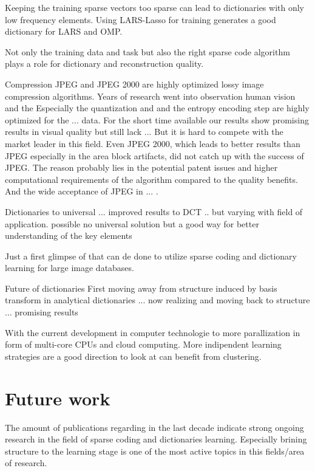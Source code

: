 Keeping the training sparse vectors too sparse can lead to dictionaries with
only low frequency elements. Using LARS-Lasso for training generates a good
dictionary for LARS and OMP. 




Not only the training data and task but also the right
sparse code algorithm plays a role for dictionary and reconstruction quality.


Compression 
JPEG and JPEG 2000 are highly optimized lossy image compression algorithms. 
Years of research went into observation human vision and the 
Especially the quantization and and the entropy encoding step are highly
optimized for the ... data.
For the short time available our results show promising results in visual
quality but still lack ...
But it is hard to compete with the market leader in this field.  Even JPEG 2000,
which leads to better results than JPEG especially in the area block artifacts,
did not catch up with the success of JPEG. 
The reason probably lies in the potential patent issues and higher computational
requirements of the algorithm compared
to the quality benefits. And the wide acceptance of JPEG in ...
.


Dictionaries to universal ... improved results to DCT .. but varying with field
of application. possible no universal solution but a good way for better
understanding of the key elements 

Just a first glimpse of that can de done to utilize sparse coding and
dictionary learning for large image databases.

Future of dictionaries
First moving away from structure induced by basis transform in analytical
dictionaries ... now realizing and moving back to structure ... promising
results\cite{?,?,?}

With the current development in computer technologie to more
parallization in form of multi-core CPUs and cloud computing. 
More indipendent learning strategies are a good direction to look at can
benefit from clustering. 



\section{Future work}
The amount of publications regarding in the last decade indicate strong ongoing
research in the field of sparse coding and dictionaries learning. Especially
brining structure to the learning stage is one of the most active topics in this
fields/area of research. 

